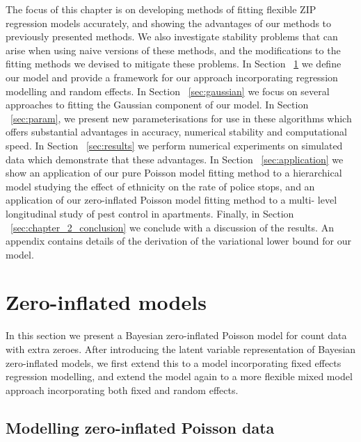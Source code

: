 The focus of this chapter is on developing methods of fitting flexible ZIP
regression models accurately, and showing the advantages of our methods to
previously presented methods. We also investigate stability problems that can
arise when using naive versions of these methods, and the modifications to the
fitting methods we devised to mitigate these problems. In Section
~\ref{sec:zero_inflated_model} we define our model and provide a framework for
our approach incorporating regression modelling and random effects. In Section
~\ref{sec:gaussian} we focus on several approaches to fitting the Gaussian
component of our model. In Section ~\ref{sec:param}, we present new
parameterisations for use in these algorithms which offers substantial
advantages in accuracy, numerical stability and computational speed. In Section
~\ref{sec:results} we perform numerical experiments on simulated data which
demonstrate that these advantages. In Section ~\ref{sec:application} we show an
application of our pure Poisson model fitting method to a hierarchical model
studying the effect of ethnicity on the rate of police stops, and an
application of our zero-inflated Poisson model fitting method to a multi- level
longitudinal study of pest control in apartments. Finally, in Section
~\ref{sec:chapter_2_conclusion} we conclude with a discussion of the results.
An appendix contains details of the derivation of the variational lower bound
for our model.

\section{Zero-inflated models}
\label{sec:zero_inflated_model}

In this section we present a Bayesian zero-inflated Poisson model for count
data with extra zeroes. After introducing the latent variable representation of
Bayesian zero-inflated models, we first extend this to a model incorporating
fixed effects regression modelling, and extend the model again to a more
flexible mixed model approach incorporating both fixed and random effects.

\newpage 

\subsection{Modelling zero-inflated Poisson data}

